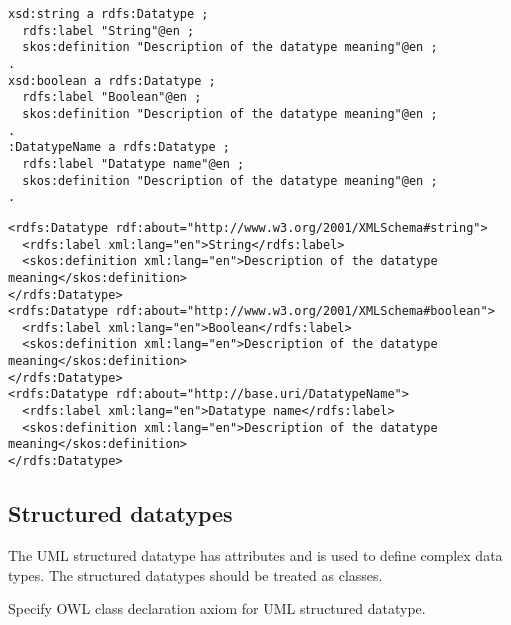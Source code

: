 \vspace{-\parskip}
\begin{minipage}[b]{.394\textwidth}
\begin{lstlisting}[language=Turtle, caption={Datatype declaration in Turtle syntax}, captionpos=b]
xsd:string a rdfs:Datatype ;
  rdfs:label "String"@en ;
  skos:definition "Description of the datatype meaning"@en ;
.
xsd:boolean a rdfs:Datatype ;
  rdfs:label "Boolean"@en ;
  skos:definition "Description of the datatype meaning"@en ;
.
:DatatypeName a rdfs:Datatype ;
  rdfs:label "Datatype name"@en ;
  skos:definition "Description of the datatype meaning"@en ;
.
\end{lstlisting}
\end{minipage}%
\quad\vspace{-\parskip}
\begin{minipage}[b]{.62\textwidth}
\begin{lstlisting}[language=RDF/XML, caption={Datatype declaration in RDF/XML syntax}, captionpos=b]
<rdfs:Datatype rdf:about="http://www.w3.org/2001/XMLSchema#string">
  <rdfs:label xml:lang="en">String</rdfs:label>
  <skos:definition xml:lang="en">Description of the datatype meaning</skos:definition>  
</rdfs:Datatype>
<rdfs:Datatype rdf:about="http://www.w3.org/2001/XMLSchema#boolean">
  <rdfs:label xml:lang="en">Boolean</rdfs:label>
  <skos:definition xml:lang="en">Description of the datatype meaning</skos:definition>  
</rdfs:Datatype>
<rdfs:Datatype rdf:about="http://base.uri/DatatypeName">
  <rdfs:label xml:lang="en">Datatype name</rdfs:label>
  <skos:definition xml:lang="en">Description of the datatype meaning</skos:definition>  
</rdfs:Datatype>
\end{lstlisting}
\end{minipage}
\vspace{-\parskip}

\subsection{Structured datatypes}

The UML structured datatype \citep{uml2.5} has attributes and is used to define complex data types. The structured datatypes should be treated as classes.

\begin{trule}
	\label{rule:datatype-structured-core}	
	Specify OWL class declaration axiom for UML structured datatype.
\end{trule}

